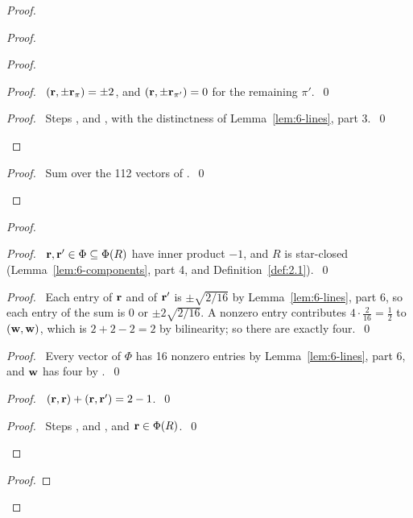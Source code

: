 \begin{proof}
\begin{proof}
\begin{proof}
   \begin{proof}\pf\ $({\mathbf r},\pm{\mathbf r}_\pi)=\pm2$, and $({\mathbf r},\pm{\mathbf r}_{\pi'})=0$ for the remaining
    $\pi'$.~\qed\end{proof}
   \qedstep
   \begin{proof}\pf\ Steps ,  and , with
    the distinctness of Lemma~\ref{lem:6-lines}, part 3.~\qed\end{proof}
  \end{proof}
  \qedstep
  \begin{proof}\pf\ Sum  over the 112 vectors of .~\qed
  \end{proof}
 \end{proof}
 \begin{proof}
  \begin{proof}\pf\ ${\mathbf r},{\mathbf r}'\in\Phi\subseteq\Phi(R)$ have inner product $-1$, and $R$ is star-closed
   (Lemma~\ref{lem:6-components}, part 4, and Definition~\ref{def:2.1}).~\qed\end{proof}
  \begin{proof}\pf\ Each entry of ${\mathbf r}$ and of ${\mathbf r}'$ is $\pm\sqrt{2/16}$ by
   Lemma~\ref{lem:6-lines}, part 6, so each entry of the sum is $0$ or $\pm2\sqrt{2/16}$. A
   nonzero entry contributes $4\cdot\frac2{16}=\frac12$ to $({\mathbf w},{\mathbf w})$, which is $2+2-2=2$ by
   bilinearity; so there are exactly four.~\qed\end{proof}
  \begin{proof}\pf\ Every vector of $\Phi$ has 16 nonzero entries by Lemma~\ref{lem:6-lines},
   part 6, and ${\mathbf w}$ has four by .~\qed\end{proof}
  \begin{proof}\pf\ $({\mathbf r},{\mathbf r})+({\mathbf r},{\mathbf r}')=2-1$.~\qed\end{proof}
  \qedstep
  \begin{proof}\pf\ Steps ,  and , and
   ${\mathbf r}\in\Phi(R)$.~\qed\end{proof}
 \end{proof}
 \begin{proof}
\end{proof}
\end{proof}
